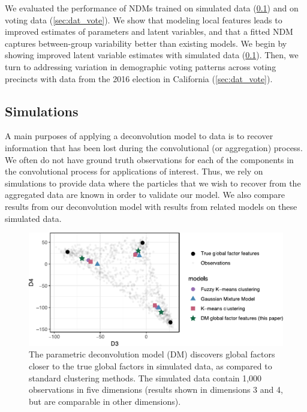 \documentclass[twoside,11pt]{article}
\begin{document}
We evaluated the performance of NDMs trained on simulated data (\cref{sec:dat_sim}) and on voting data (\cref{sec:dat_vote}).  We show that modeling local features leads to improved estimates of parameters and latent variables,
and that a fitted NDM captures between-group variability better than existing models.
We begin by showing improved latent variable estimates with simulated data (\cref{sec:dat_sim}). Then, we turn to addressing variation in demographic voting patterns across voting precincts with data from the 2016 election in California (\cref{sec:dat_vote}).

\subsection{Simulations}
\label{sec:dat_sim}

A main purposes of applying a deconvolution model to data is to recover information that has been lost during the convolutional (or aggregation) process. We often do not have ground truth observations for each of the components in the convolutional process for applications of interest. Thus, we rely on simulations to provide data where the particles that we wish to recover from the aggregated data are known in order to validate our model. We also compare results from our deconvolution model with results from related models on these simulated data.

\begin{figure}
\centering
\includegraphics[width=6in]{simK3.pdf}
\caption{The parametric deconvolution model (DM) discovers global factors closer to the true global factors in simulated data, as compared to standard clustering methods.  The simulated data contain 1,000 observations in five dimensions (results shown in dimensions 3 and 4, but are comparable in other dimensions).}
\label{fig:sim_3K}
\end{figure}
\end{document}
